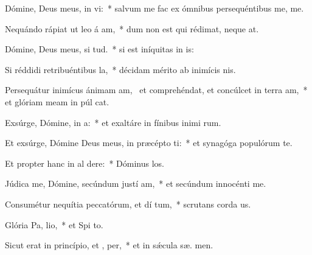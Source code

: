 \item Dómine, Deus meus, in  vi:~* salvum me fac ex ómnibus persequéntibus me,   me.
\item Nequándo rápiat ut leo á am,~* dum non est qui rédimat, neque   at.
\item Dómine, Deus meus, si  tud.~* si est iníquitas in  is:
\item Si réddidi retribuéntibus  la,~* décidam mérito ab inimícis  nis.
\item Persequátur inimícus ánimam am,~\pscross{} et comprehéndat, et concúlcet in terra  am,~* et glóriam meam in púl cat.
\item Exsúrge, Dómine, in  a:~* et exaltáre in fínibus inimi rum.
\item Et exsúrge, Dómine Deus meus, in præcépto  ti:~* et synagóga populórum  te.
\item Et propter hanc in al dere:~* Dóminus  los.
\item Júdica me, Dómine, secúndum justí am,~* et secúndum innocénti   me.
\item Consumétur nequítia peccatórum, et dí tum,~* scrutans corda   us.
\item Glória Pa,  lio,~* et Spi to.
\item Sicut erat in princípio, et ,  per,~* et in sǽcula sæ. men.
